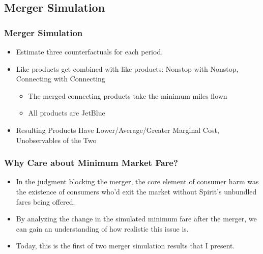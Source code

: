 \documentclass[xcolor=dvipsnames]{beamer}
\let\Oldsubsection\subsection
\renewcommand{\subsection}{\FloatBarrier\Oldsubsection}
\begin{document}
    \subsection{Merger Simulation}
   	\begin{frame}
		\frametitle{Merger Simulation}
			\begin{itemize}
            \item Estimate three counterfactuals for each period.
                \item Like products get combined with like products: Nonstop with Nonstop, Connecting with Connecting
                    \begin{itemize}
                        \item The merged connecting products take the minimum miles flown 
                        \item All products are JetBlue
                    \end{itemize}
				\item Resulting Products Have Lower/Average/Greater Marginal Cost, Unobservables of the Two
        \end{itemize}
	\end{frame}

    
    \begin{frame}
        \frametitle{Why Care about Minimum Market Fare?}
        \begin{itemize}
            \item In the judgment blocking the merger, the core element of consumer harm was the existence of consumers who'd exit the market without Spirit's unbundled fares being offered.
            \item By analyzing the change in the simulated minimum fare after the merger, we can gain an understanding of how realistic this issue is.
            \item Today, this is the first of two merger simulation results that I present.
        \end{itemize}
    \end{frame}
\end{document}
